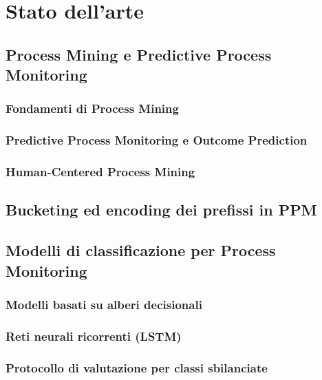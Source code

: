 \chapter{Stato dell'arte}
\label{cha:state_of_art}

\section{Process Mining e Predictive Process Monitoring}
\label{sec:process_mining}

\subsection{Fondamenti di Process Mining}
\label{subsec:pm_foundations}

\subsection{Predictive Process Monitoring e Outcome Prediction}
\label{subsec:ppm_outcome_prediction}

\subsection{Human-Centered Process Mining}
\label{subsec:human_centered_pm}

\section{Bucketing ed encoding dei prefissi in PPM}
\label{sec:lit_bucketing_encoding}

\section{Modelli di classificazione per Process Monitoring}
\label{sec:classification_models}

\subsection{Modelli basati su alberi decisionali}
\label{subsec:tree_based_models}

\subsection{Reti neurali ricorrenti (LSTM)}
\label{subsec:recurrent_neural_networks}

\subsection{Protocollo di valutazione per classi sbilanciate}
\label{subsec:evaluation_protocol}

